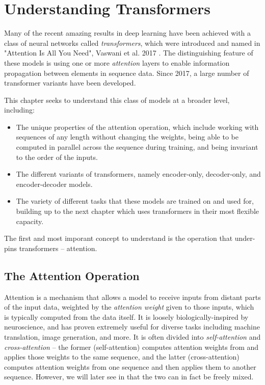 \chapter{Understanding Transformers}
\label{C:transformers}

Many of the recent amazing results in deep learning have been achieved with a class of neural networks called \textit{transformers}, which were introduced and named in "Attention Is All You Need", Vaswani et al. 2017 \cite{attention-is-all-you-need}. The distinguishing feature of these models is using one or more \textit{attention} layers to enable information propagation between elements in sequence data. Since 2017, a large number of transformer variants have been developed.

This chapter seeks to understand this class of models at a broader level, including:
\begin{itemize}
    \item The unique properties of the attention operation, which include working with sequences of any length without changing the weights, being able to be computed in parallel across the sequence during training, and being invariant to the order of the inputs.
    \item The different variants of transformers, namely encoder-only, decoder-only, and encoder-decoder models.
    \item The variety of different tasks that these models are trained on and used for, building up to the next chapter which uses transformers in their most flexible capacity.
\end{itemize}

The first and most imporant concept to understand is the operation that under-pins transformers -- attention.
\section{The Attention Operation}
\label{S:attn}

Attention is a mechanism that allows a model to receive inputs from distant parts of the input data, weighted by the \textit{attention weight} given to those inputs, which is typically computed from the data itself. It is loosely biologically-inspired by neuroscience, and has proven extremely useful for diverse tasks including machine translation, image generation, and more. It is often divided into \textit{self-attention} and \textit{cross-attention} -- the former (self-attention) computes attention weights from and applies those weights to the same sequence, and the latter (cross-attention) computes attention weights from one sequence and then applies them to another sequence. However, we will later see in  that the two can in fact be freely mixed.

